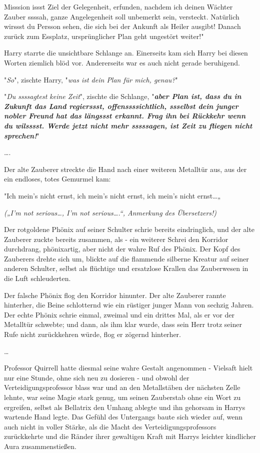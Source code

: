 {{{Misssion issst Ziel der Gelegenheit, erfunden, nachdem ich deinen Wächter Zauber ssssah, ganze Angelegenheit soll unbemerkt sein, versteckt. Natürlich wirssst du Persson sehen, die sich bei der Ankunft als Heiler ausgibt! Danach zurück zum Essplatz, ursprünglicher Plan geht ungestört weiter!}}"

Harry starrte die unsichtbare Schlange an. Einerseits kam sich Harry bei diesen Worten ziemlich blöd vor. Andererseits war es auch nicht gerade beruhigend.

"\emph{So}", zischte Harry, "\emph{was ist dein Plan für mich, genau?}"

"\emph{Du ssssagtest keine Zeit}", zischte die Schlange, "\textbf{\emph{aber Plan ist, dass du in Zukunft das Land regierssst, offenssssichtlich, ssselbst dein junger nobler Freund hat das längssst erkannt. Frag ihn bei Rückkehr wenn du wilsssst. Werde jetzt nicht mehr sssssagen, ist Zeit zu fliegen nicht sprechen!}}"

….

Der alte Zauberer streckte die Hand nach einer weiteren Metalltür aus, aus der ein endloses, totes Gemurmel kam:

"Ich mein's nicht ernst, ich mein's nicht ernst, ich mein's nicht ernst…„

\emph{(„I'm not serious…, I'm not serious….“, Anmerkung des Übersetzers!)}

Der rotgoldene Phönix auf seiner Schulter schrie bereits eindringlich, und der alte Zauberer zuckte bereits zusammen, als - ein weiterer Schrei den Korridor durchdrang, phönixartig, aber nicht der wahre Ruf des Phönix. Der Kopf des Zauberers drehte sich um, blickte auf die flammende silberne Kreatur auf seiner anderen Schulter, selbst als flüchtige und ersatzlose Krallen das Zauberwesen in die Luft schleuderten.

Der falsche Phönix flog den Korridor hinunter. Der alte Zauberer rannte hinterher, die Beine schlotternd wie ein rüstiger junger Mann von sechzig Jahren. Der echte Phönix schrie einmal, zweimal und ein drittes Mal, als er vor der Metalltür schwebte; und dann, als ihm klar wurde, dass sein Herr trotz seiner Rufe nicht zurückkehren würde, flog er zögernd hinterher.

…

Professor Quirrell hatte diesmal seine wahre Gestalt angenommen - Vielsaft hielt nur eine Stunde, ohne sich neu zu dosieren - und obwohl der Verteidigungsprofessor blass war und an den Metallstäben der nächsten Zelle lehnte, war seine Magie stark genug, um seinen Zauberstab ohne ein Wort zu ergreifen, selbst als Bellatrix den Umhang ablegte und ihn gehorsam in Harrys wartende Hand legte. Das Gefühl des Untergangs baute sich wieder auf, wenn auch nicht in voller Stärke, als die Macht des Verteidigungsprofessors zurückkehrte und die Ränder ihrer gewaltigen Kraft mit Harrys leichter kindlicher Aura zusammenstießen.

}
